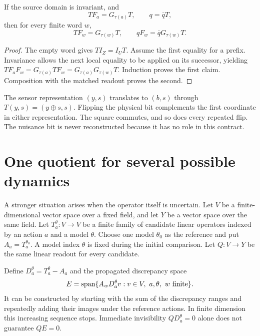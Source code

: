 \begin{Coretheorem}\label{Core:r:transport}
If the source domain is invariant, and
\[
TF_a=G_{\tau(a)}T,\qquad q=\bar qT,
\]
then for every finite word $w$,
\[
TF_w=G_{\tau(w)}T,\qquad qF_w=\bar qG_{\tau(w)}T.
\]
\end{Coretheorem}
\begin{proof}
The empty word gives $TI_Z=I_UT$. Assume the first equality for a prefix. Invariance allows the next local equality to be applied on its successor, yielding
$TF_aF_w=G_{\tau(a)}TF_w=G_{\tau(a)}G_{\tau(w)}T$.
Induction proves the first claim. Composition with the matched readout proves the second.
\end{proof}

The sensor representation $(y,s)$ translates to $(b,s)$ through $T(y,s)=(y\oplus s,s)$. Flipping the physical bit complements the first coordinate in either representation. The square commutes, and so does every repeated flip. The nuisance bit is never reconstructed because it has no role in this contract.

\section{One quotient for several possible dynamics}
A stronger situation arises when the operator itself is uncertain. Let $V$ be a finite-dimensional vector space over a fixed field, and let $Y$ be a vector space over the same field. Let $T_a^\theta:V\to V$ be a finite family of candidate linear operators indexed by an action $a$ and a model $\theta$. Choose one model $\theta_0$ as the reference and put $A_a=T_a^{\theta_0}$. A model index $\theta$ is fixed during the initial comparison. Let $Q:V\to Y$ be the same linear readout for every candidate.

Define $D_a^\theta=T_a^\theta-A_a$ and the propagated discrepancy space
\[
E=\CoreSpan\{A_wD_a^\theta v: v\in V,\ a,\theta,\ w\text{ finite}\}.
\]
It can be constructed by starting with the sum of the discrepancy ranges and repeatedly adding their images under the reference actions. In finite dimension this increasing sequence stops. Immediate invisibility $QD_a^\theta=0$ alone does not guarantee $QE=0$.

